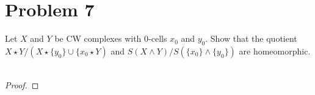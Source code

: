 \documentclass[fontsize=11pt]{scrartcl} %
\numberwithin{equation}{section} %
\numberwithin{figure}{section} %
\numberwithin{table}{section} %
\begin{document}
\section*{Problem 7}
Let $X$ and $Y$ be CW complexes with $0$-cells $x_0$ and $y_0$. Show that the
quotient $X\star Y/(X\star\{y_0\}\cup \{x_0\star Y)$ and $S(X\wedge
Y)/S(\{x_0\}\wedge \{y_0\})$ are homeomorphic.
\\
\\
\begin{proof}
    
\end{proof}
\end{document}
